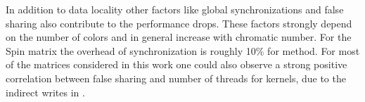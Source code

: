   In addition to data locality other factors like global synchronizations and false sharing also contribute to the performance drops. These factors strongly depend on the number of colors and in general increase with chromatic number. For the Spin matrix the overhead of synchronization is roughly 10\% for \MC method.  For most of the matrices considered in this work one could also observe a strong positive correlation between false sharing and number of threads for \SymmSpmv kernels, due to the indirect writes in \SymmSpmv.
 
 




 


